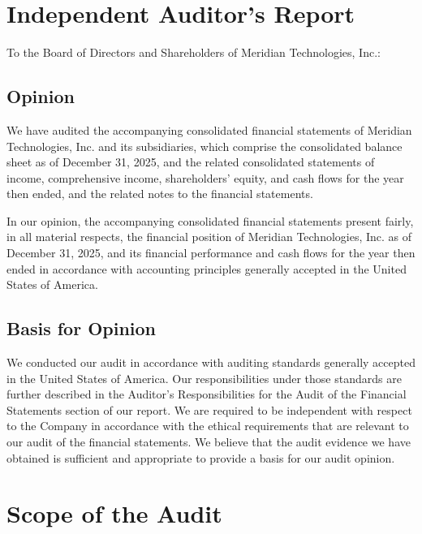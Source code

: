 \documentclass[
    language=english,
    doctype=audit-report,
    institution=none,
]{../../omnilatex}
\begin{document}
\maketitle

\section*{Independent Auditor's Report}

To the Board of Directors and Shareholders of Meridian Technologies, Inc.:

\subsection*{Opinion}

We have audited the accompanying consolidated financial statements of Meridian
Technologies, Inc. and its subsidiaries, which comprise the consolidated
balance sheet as of December 31, 2025, and the related consolidated
statements of income, comprehensive income, shareholders' equity, and cash
flows for the year then ended, and the related notes to the financial
statements.

In our opinion, the accompanying consolidated financial statements present
fairly, in all material respects, the financial position of Meridian
Technologies, Inc. as of December 31, 2025, and its financial performance
and cash flows for the year then ended in accordance with accounting
principles generally accepted in the United States of America.

\subsection*{Basis for Opinion}

We conducted our audit in accordance with auditing standards generally
accepted in the United States of America. Our responsibilities under those
standards are further described in the Auditor's Responsibilities for the
Audit of the Financial Statements section of our report. We are required to
be independent with respect to the Company in accordance with the ethical
requirements that are relevant to our audit of the financial statements. We
believe that the audit evidence we have obtained is sufficient and appropriate
to provide a basis for our audit opinion.

\section{Scope of the Audit}
\end{document}
